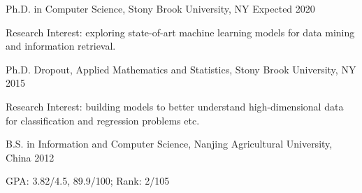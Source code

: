 


\begin{cventries}


\eduentry
{Ph.D. in Computer Science, Stony Brook University, NY} %
{Expected 2020} %
{ %
\begin{cvitems}
\item {Research Interest: exploring state-of-art machine learning models for data mining and information retrieval.}
\end{cvitems}
}


\eduentry
{Ph.D. Dropout, Applied Mathematics and Statistics, Stony Brook University, NY} %
{2015} %
{ %
\begin{cvitems}
\item {Research Interest: building models to better understand high-dimensional data for classification and regression problems etc.}
\end{cvitems}
}


\eduentry
{B.S. in Information and Computer Science, Nanjing Agricultural University, China} %
{2012} %
{ %
\begin{cvitems}
\item {GPA: 3.82/4.5, 89.9/100; Rank: 2/105}
\end{cvitems}
}



\end{cventries}